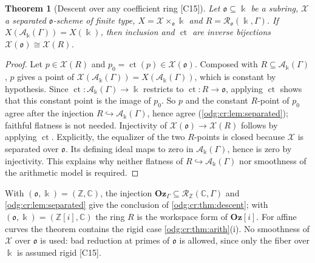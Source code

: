 \documentclass[11pt,oneside]{article}
\numberwithin{equation}{section}
\newtheorem{theorem}{Theorem}[section]
\theoremstyle{definition}
\theoremstyle{remark}
\newcommand{\Oz}{\mathbf{Oz}}
\newcommand{\Z}{\mathbb Z}
\newcommand{\C}{\mathbb C}
\newcommand{\ct}{\operatorname{ct}}
\newcommand{\src}[1]{\textup{\textsf{\small[#1]}}}
\newcommand{\Og}{\Oz[i]}
\newcommand{\crA}{\mathcal A_\Bbbk(\Gamma)}
\begin{document}
\begin{theorem}[Descent over any coefficient ring \src{C15}]\label{odg:log:thm:descent}
Let $\mathfrak o\subseteq\Bbbk$ be a subring, $\mathcal X$ a separated $\mathfrak o$-scheme of
finite type, $X=\mathcal X\times_{\mathfrak o}\Bbbk$ and
$R=\mathcal R_{\mathfrak o}(\Bbbk,\Gamma)$. If $X(\crA)=X(\Bbbk)$, then inclusion and $\ct$ are
inverse bijections $\mathcal X(\mathfrak o)\cong\mathcal X(R)$.
\end{theorem}
\begin{proof}
Let $p\in\mathcal X(R)$ and $p_0=\ct(p)\in\mathcal X(\mathfrak o)$. Composed with
$R\subseteq\crA$, $p$ gives a point of $\mathcal X(\crA)=X(\crA)$, which is constant by
hypothesis. Since $\ct:\crA\to\Bbbk$ restricts to $\ct:R\to\mathfrak o$, applying $\ct$
shows that this constant point is the image of $p_0$. So $p$ and the constant $R$-point
of $p_0$ agree after the injection $R\hookrightarrow\crA$, hence agree
(\cref{odg:cr:lem:separated}); faithful flatness is not needed. Injectivity of
$\mathcal X(\mathfrak o)\to\mathcal X(R)$ follows by applying $\ct$.
Explicitly, the equalizer of the two $R$-points is closed because
$\mathcal X$ is separated over $\mathfrak o$. Its defining ideal maps
to zero in $\crA$, hence is zero by injectivity. This explains why
neither flatness of $R\hookrightarrow\crA$ nor smoothness of the
arithmetic model is required.
\end{proof}

With $(\mathfrak o,\Bbbk)=(\Z,\C)$, the injection
$\Oz_\Gamma\subseteq\mathcal R_\Z(\C,\Gamma)$ and \cref{odg:cr:lem:separated} give the
conclusion of \cref{odg:cr:thm:descent}; with $(\mathfrak o,\Bbbk)=(\Z[i],\C)$ the ring
$R$ is the workspace form of $\Og$. For affine curves the theorem contains the rigid case
\cref{odg:cr:thm:arith}(i). No smoothness of $\mathcal X$ over $\mathfrak o$ is used: bad
reduction at primes of $\mathfrak o$ is allowed, since only the fiber over $\Bbbk$ is
assumed rigid \src{C15}.
\end{document}
